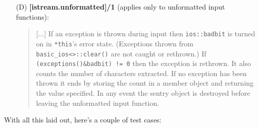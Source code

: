 \documentclass{wg21}
\newcommand{\cc}[1]{\texttt{#1}}
\begin{document}
\begin{enumerate}
  \item[(D)] \textbf{[istream.unformatted]/1} (applies only to unformatted input functions):
  \begin{quote}
  [...] If an exception is thrown during input then \cc{ios::badbit} is turned
  on in \cc{*this}'s error state. (Exceptions thrown from \cc{basic_ios<>::clear()}
  are not caught or rethrown.) If \cc{(exceptions()&badbit) != 0} then the
  exception is rethrown. It also counts the number of characters extracted.
  If no exception has been thrown it ends by storing the count in a member
  object and returning the value specified. In any event the sentry object
  is destroyed before leaving the unformatted input function.
  \end{quote}
\end{enumerate}

With all this laid out, here's a couple of test cases:
\end{document}
